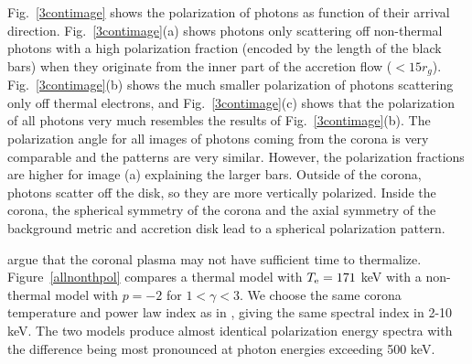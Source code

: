 \documentclass[manuscript]{aastex}
\begin{document}
Fig.~\ref{3contimage} shows the polarization of photons as function of their arrival direction.
Fig.~\ref{3contimage}(a) shows photons only scattering off non-thermal photons 
with a high polarization fraction (encoded by the length of the black bars) 
when they originate from the inner part of the accretion flow ($<15 r_g$). 
Fig.~\ref{3contimage}(b) shows the much smaller polarization of photons scattering only off thermal electrons, 
and Fig.~\ref{3contimage}(c) shows that the polarization of all photons very much resembles the results of
Fig.~\ref{3contimage}(b). The polarization angle for all images of photons coming from the corona is very comparable and the patterns are very similar. However, the polarization fractions are higher for image (a) explaining the larger bars. Outside of the corona, photons scatter off the disk, so they are more vertically polarized. Inside the corona, the spherical symmetry of the corona and the axial symmetry of the background metric and accretion disk lead to a spherical polarization pattern.
  

\citet{ghi93} argue that the coronal plasma may not have sufficient time to thermalize. Figure~\ref{allnonthpol}
compares a thermal model with  $T_{\rm e}= 171$ keV with a non-thermal model with $p=-2$ for $1<\gamma<3$. We choose the same corona temperature and power law index as in \citet{ghi93}, giving the same spectral index in 2-10 keV.
The two models produce almost identical polarization energy spectra with the difference being most pronounced at 
photon energies exceeding 500 keV.
%
\end{document}

